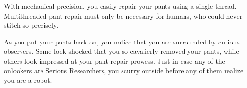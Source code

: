 With mechanical precision, you easily repair your pants using a single thread.
Multithreaded pant repair must only be necessary for humans,
who could never stitch so precisely.

As you put your pants back on,
you notice that you are surrounded by curious observers.
Some look shocked that you so cavalierly removed your pants,
while others look impressed at your pant repair prowess.
Just in case any of the onlookers are Serious Researchers,
you scurry outside before any of them realize you are a robot.



